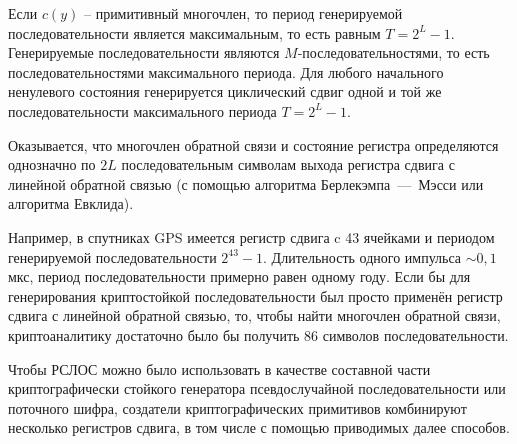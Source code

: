 Если $c(y)$ -- примитивный многочлен, то период генерируемой последовательности является максимальным, то есть равным $T = 2^{L} - 1$. Генерируемые последовательности являются $M$-последовательностями, то есть последовательностями максимального периода. Для любого начального ненулевого состояния генерируется циклический сдвиг одной и той же последовательности максимального периода $T=2^{L} - 1$.

Оказывается, что многочлен обратной связи и состояние регистра определяются однозначно по $2L$ последовательным символам выхода регистра сдвига с линейной обратной связью (с помощью алгоритма Берлекэмпа~---~Мэсси или алгоритма Евклида).

Например, в спутниках GPS имеется регистр сдвига c 43 ячейками и периодом генерируемой последовательности $2^{43} - 1$. Длительность одного импульса $\sim 0{,}1$ мкс, период последовательности примерно равен одному году. Если бы для генерирования криптостойкой последовательности был просто применён регистр сдвига с линейной обратной связью, то, чтобы найти многочлен обратной связи, криптоаналитику достаточно было бы получить 86 символов последовательности.

Чтобы РСЛОС можно было использовать в качестве составной части криптографически стойкого генератора псевдослучайной последовательности или поточного шифра, создатели криптографических примитивов комбинируют несколько регистров сдвига, в том числе с помощью приводимых далее способов.
